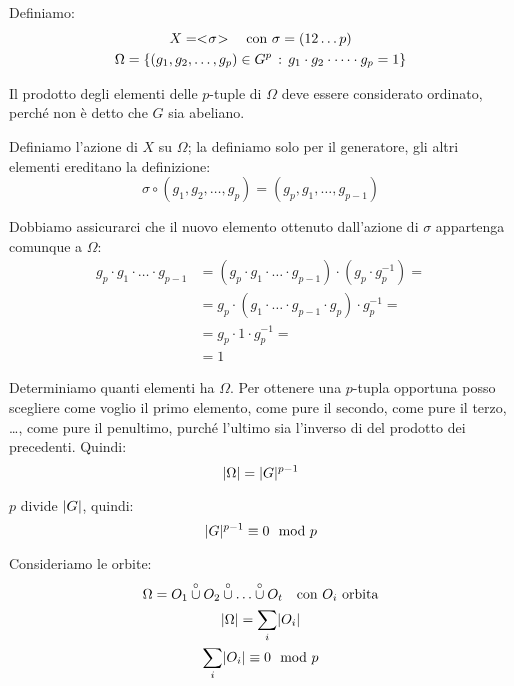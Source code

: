 \begin{dimostrazione}
    Definiamo:
    \begin{gather*}
        X = < \negmedspace \sigma \negmedspace > \quad \text{con } \sigma = (12 \dots p) \\
        \Omega = \{(g_1, g_2, \dots, g_p) \in G^p \,:\, g_1 \cdot g_2 \cdot \dots \cdot g_p = 1\}
    \end{gather*}

    Il prodotto degli elementi delle $p$-tuple di $\Omega$ deve essere considerato ordinato, perché non è detto che $G$
    sia abeliano.

    Definiamo l'azione di $X$ su $\Omega$;
    la definiamo solo per il generatore, gli altri elementi ereditano la definizione:
    \begin{equation*}
        \sigma \circ (g_1, g_2, \dots, g_p) = (g_p, g_1, \dots, g_{p-1})
    \end{equation*}

    Dobbiamo assicurarci che il nuovo elemento ottenuto dall'azione di $\sigma$ appartenga comunque a $\Omega$:
    \begin{align*}
        g_p \cdot g_1 \cdot \dots \cdot g_{p-1} &= (g_p \cdot g_1 \cdot \dots \cdot g_{p-1}) \cdot (g_p \cdot g_p^{-1}) = \\
        &= g_p \cdot (g_1 \cdot \dots \cdot g_{p-1} \cdot g_p) \cdot g_p^{-1} = \\
        &= g_p \cdot 1 \cdot g_p^{-1} = \\
        &= 1
    \end{align*}

    Determiniamo quanti elementi ha $\Omega$.
    Per ottenere una $p$-tupla opportuna posso scegliere come voglio il primo elemento, come pure il secondo, come pure
    il terzo, \dots, come pure il penultimo, purché l'ultimo sia l'inverso di del prodotto dei precedenti. Quindi:
    \begin{equation*}
        \lvert \Omega \rvert = \lvert G \rvert^{p-1}
    \end{equation*}

    $p$ divide $\lvert G \rvert$, quindi:
    \begin{equation*}
        \lvert G \rvert^{p-1} \equiv 0 \mod p
    \end{equation*}
    
    Consideriamo le orbite:
    \begin{gather*}
        \Omega = O_1 \overset{\circ}{\cup} O_2 \overset{\circ}{\cup} \dots \overset{\circ}{\cup} O_t \quad \text{con } O_i \text{ orbita} \\
        \lvert \Omega \rvert = \sum_{i} \lvert O_i \rvert \\
        \sum_i \lvert O_i \rvert \equiv 0 \mod p
    \end{gather*}


\end{dimostrazione}
